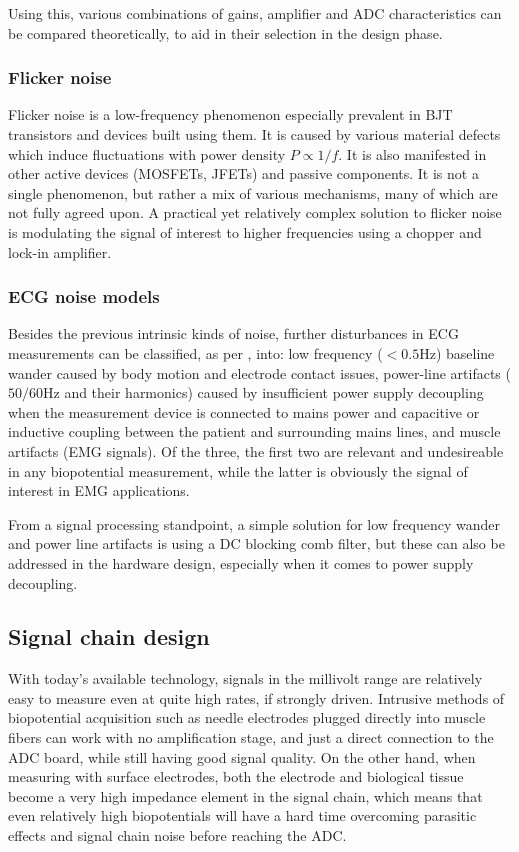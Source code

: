 \documentclass{thesis}
\newcommand{\Hz}{\unit{\hertz}}
\begin{document}
Using this, various combinations of gains, amplifier and ADC characteristics can be compared theoretically, to aid in their selection in the design phase.

\subsubsection{Flicker noise}

Flicker noise is a low-frequency phenomenon especially prevalent in BJT transistors and devices built using them. It is caused by various material defects which induce fluctuations with power density $P \propto 1/f$. It is also manifested in other active devices (MOSFETs, JFETs) and passive components. It is not a single phenomenon, but rather a mix of various mechanisms, many of which are not fully agreed upon. A practical yet relatively complex solution to flicker noise is modulating the signal of interest to higher frequencies using a chopper and lock-in amplifier. \cite{flickernoise}

\subsubsection{ECG noise models}

Besides the previous intrinsic kinds of noise, further disturbances in ECG measurements can be classified, as per \cite{Chatterjee2020}, into: low frequency ($< 0.5\Hz$) baseline wander caused by body motion and electrode contact issues, power-line artifacts ($50/60\Hz$ and their harmonics) caused by insufficient power supply decoupling when the measurement device is connected to mains power and capacitive or inductive coupling between the patient and surrounding mains lines, and muscle artifacts (EMG signals). Of the three, the first two are relevant and undesireable in any biopotential measurement, while the latter is obviously the signal of interest in EMG applications.

From a signal processing standpoint, a simple solution for low frequency wander and power line artifacts is using a DC blocking comb filter, but these can also be addressed in the hardware design, especially when it comes to power supply decoupling.

\subsection{Signal chain design}

With today's available technology, signals in the millivolt range are relatively easy to measure even at quite high rates, if strongly driven. Intrusive methods of biopotential acquisition such as needle electrodes plugged directly into muscle fibers can work with no amplification stage, and just a direct connection to the ADC board, while still having good signal quality. On the other hand, when measuring with surface electrodes, both the electrode and biological tissue become a very high impedance element in the signal chain, which means that even relatively high biopotentials will have a hard time overcoming parasitic effects and signal chain noise before reaching the ADC.
\end{document}
